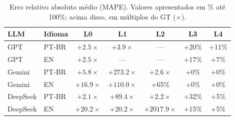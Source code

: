 \begin{table}[h]
\centering
\caption{MAPE por LLM $\times$ idioma $\times$ nível (média sobre 3 escopos $\times$ 5 reps).}
\label{tab:summary}
\begin{tabular}{llccccc}
\toprule
\textbf{LLM} & \textbf{Idioma} & \textbf{L0} & \textbf{L1} & \textbf{L2} & \textbf{L3} & \textbf{L4} \\
\midrule
GPT & PT-BR & $+2.5\times$ & $+3.9\times$ & --- & +20\% & +11\% \\
GPT & EN & $+2.5\times$ & --- & --- & +17\% & +7\% \\
Gemini & PT-BR & $+5.8\times$ & $+273.2\times$ & $+2.6\times$ & +0\% & +0\% \\
Gemini & EN & $+16.9\times$ & $+110.0\times$ & +65\% & +0\% & +0\% \\
DeepSeek & PT-BR & $+2.1\times$ & $+89.4\times$ & $+2.2\times$ & +32\% & +5\% \\
DeepSeek & EN & $+20.2\times$ & $+20.2\times$ & $+2017.9\times$ & +15\% & +5\% \\
\bottomrule
\end{tabular}
\caption*{\footnotesize Erro relativo absoluto médio (MAPE). Valores apresentados em \% até 100\%; acima disso, em múltiplos do GT ($\times$).}
\end{table}